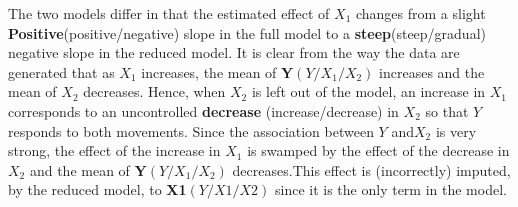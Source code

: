 \documentclass[12pt]{article}
\makeatletter
\theoremstyle{homework}
\newenvironment{exercise}[1]
{\def\@currentlabel{#1}\exercisecore}
{\endexercisecore}
\makeatother
\begin{document}
\begin{exercise}{1}
 The two models differ in that the estimated effect of $X_1$ changes from a slight \textbf{Positive}(positive/negative) 
 slope in the full model to a \textbf{steep}(steep/gradual) negative slope in the reduced model. It is clear from 
 the way the data are generated that as $X_1$ increases, the mean of \textbf{Y}$(Y/X_1/X_2)$ increases and the 
 mean of $X_2$ decreases. Hence, when $X_2$ is left out of the model, an increase in $X_1$ corresponds to an 
 uncontrolled \textbf{decrease} (increase/decrease) in $X_2$ so that $Y$ responds to both movements. Since the association
between $Y$ and$X_2$ is very strong, the effect of the increase in $X_1$ is swamped by the effect of the decrease
in $X_2$ and the mean of \textbf{Y}$(Y/X_1/X_2)$ decreases.This effect is (incorrectly) imputed, by the reduced model, 
to \textbf{X1}$(Y/X1/X2)$ since it is the only term in the model.\\
\end{exercise}
\newpage
\end{document}
